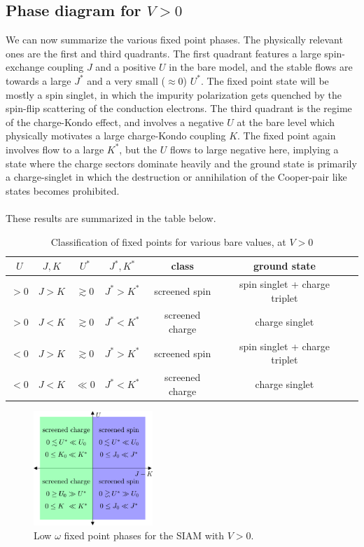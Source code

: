 \documentclass[twoside,11pt]{report}
\numberwithin{equation}{section}
\begin{document}
\subsection{Phase diagram for \(V > 0\)}
We can now summarize the various fixed point phases. The physically relevant ones are the first and third quadrants. The first quadrant features a large spin-exchange coupling \(J\) and a positive \(U\) in the bare model, and the stable flows are towards a large \(J^*\) and a very small (\(\approx 0\)) \(U^*\). The fixed point state will be mostly a spin singlet, in which the impurity polarization gets quenched by the spin-flip scattering of the conduction electrons. The third quadrant is the regime of the charge-Kondo effect, and involves a negative \(U\) at the bare level which physically motivates a large charge-Kondo coupling \(K\). The fixed point again involves flow to a large \(K^*\), but the \(U\) flows to large negative here, implying a state where the charge sectors dominate heavily and the ground state is primarily a charge-singlet in which the destruction or annihilation of the Cooper-pair like states becomes prohibited.
\\\\These results are summarized in the table below.
\begin{table}[htpb]
\centering
\begin{tabular}{|c|c|c|c|c|c|c|}
\hline
\(U \) & \(J,K \) & \(U^*\) &\(J^*,K^*\) & class & ground state \\
\hline
\(>0\)& \(J > K\)& \(\gtrsim 0\)&\(J^*>K^*\) & screened spin & spin singlet + charge triplet\\
\(>0\)& \(J < K\)& \(\gtrsim 0\) &\(J^*<K^*\) & screened charge & charge singlet\\
\(<0\)& \(J > K\)& \(\gtrsim 0\) &\(J^*>K^*\) & screened spin & spin singlet + charge triplet\\
\(<0\)& \(J < K\)& \(\ll 0\)&\(J^*<K^*\) & screened charge & charge singlet\\
\hline
\end{tabular}
\caption{Classification of fixed points for various bare values, at \(V > 0\)}
\end{table}

\begin{figure}[htpb!]
	\centering
	\includegraphics[width=0.4\textwidth]{../figures/phases_V.png}
	\caption{Low \(\omega\) fixed point phases for the SIAM with \(V>0\).}
\end{figure}
\end{document}
